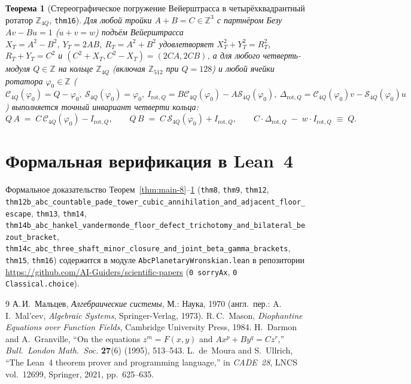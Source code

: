 \documentclass[11pt,a4paper]{article}
\theoremstyle{plain}
\newtheorem{theorem}{Теорема}[section]
\theoremstyle{definition}
\begin{document}
\begin{theorem}[Стереографическое погружение Вейерштрасса в четырёхквадрантный ротатор $\mathbb{Z}_{4Q}$, \texttt{thm16}]
\label{thm:main-12-16}
Для любой тройки $A+B=C\in\mathbb{Z}^3$ с партнёром Безу $A v - B u = 1$ ($u+v=w$) подъём Вейерштрасса $X_T = A^2-B^2,\ Y_T = 2AB,\ R_T = A^2+B^2$ удовлетворяет $X_T^2+Y_T^2=R_T^2$, $R_T+Y_T=C^2$ и $(C^2+X_T,C^2-X_T)=(2CA,2CB)$, а для любого четверть-модуля $Q\in\mathbb{Z}$ на кольце $\mathbb{Z}_{4Q}$ (включая $\mathbb{Z}_{512}$ при $Q = 128$) и любой ячейки ротатора $\varphi_0\in\mathbb{Z}$ ($\mathcal{C}_{4Q}(\varphi_0)=Q-\varphi_0,\ \mathcal{S}_{4Q}(\varphi_0)=\varphi_0,\ I_{\mathrm{rot},Q} = B\mathcal{C}_{4Q}(\varphi_0)-A\mathcal{S}_{4Q}(\varphi_0),\ \Delta_{\mathrm{rot},Q} = \mathcal{C}_{4Q}(\varphi_0)v-\mathcal{S}_{4Q}(\varphi_0)u$) выполняется точный инвариант четверти кольца:
\begin{equation}
  \label{eq:quarter-ring-invariant}
  Q\,A \;=\; C\,\mathcal{C}_{4Q}(\varphi_0) - I_{\mathrm{rot},Q},\qquad
  Q\,B \;=\; C\,\mathcal{S}_{4Q}(\varphi_0) + I_{\mathrm{rot},Q},\qquad
  C\cdot\Delta_{\mathrm{rot},Q} \;-\; w\cdot I_{\mathrm{rot},Q} \;\equiv\; Q.
\end{equation}
\end{theorem}

\section{Формальная верификация в Lean~4}
Формальное доказательство Теорем~\ref{thm:main-8}--\ref{thm:main-12-16} (\texttt{thm8}, \texttt{thm9}, \texttt{thm12}, \texttt{thm12b\_abc\_countable\_pade\_tower\_cubic\_annihilation\_and\_adjacent\_floor\_escape}, \texttt{thm13}, \texttt{thm14}, \texttt{thm14b\_abc\_hankel\_vandermonde\_floor\_defect\_trichotomy\_and\_bilateral\_bezout\_bracket}, \texttt{thm14c\_abc\_three\_shaft\_minor\_closure\_and\_joint\_beta\_gamma\_brackets}, \texttt{thm15}, \texttt{thm16}) содержится в модуле \texttt{AbcPlanetaryWronskian.lean} в репозитории \url{https://github.com/AI-Guiders/scientific-papers} (\texttt{0 sorryAx}, \texttt{0 Classical.choice}).

\begin{thebibliography}{9}
А.\,И.~Мальцев, \emph{Алгебраические системы}, М.: Наука, 1970 (англ.\ пер.: A.\,I.~Mal'cev, \emph{Algebraic Systems}, Springer-Verlag, 1973).
R.\,C.~Mason, \emph{Diophantine Equations over Function Fields}, Cambridge University Press, 1984.
H.~Darmon and A.~Granville, ``On the equations $z^m = F(x,y)$ and $Ax^p + By^q = Cz^r$,'' \emph{Bull.~London Math.~Soc.} \textbf{27}(6) (1995), 513--543.
L.~de~Moura and S.~Ullrich, ``The Lean~4 theorem prover and programming language,'' in \emph{CADE~28}, LNCS vol.~12699, Springer, 2021, pp.~625--635.
\end{thebibliography}
\end{document}
